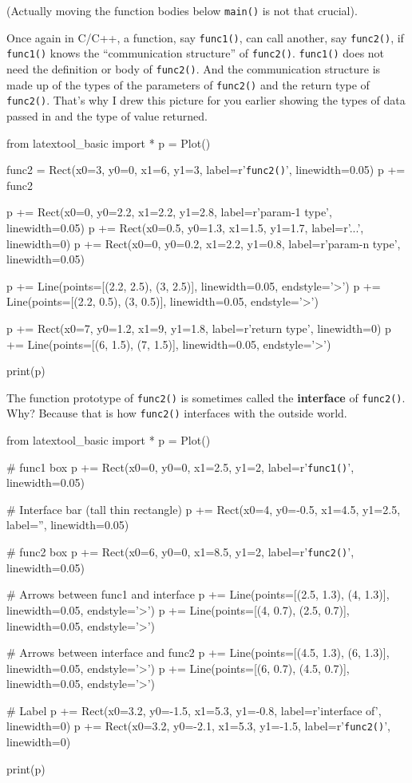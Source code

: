 (Actually moving the function bodies below \texttt{main()} is not that crucial).

Once again in C/C++, a function, say \texttt{func1()}, can call another,
say \texttt{func2()}, if \texttt{func1()} knows the ``communication
structure'' of \texttt{func2()}. \texttt{func1()} does not need the
definition or body of \texttt{func2()}. And the communication structure is
made up of the types of the parameters of \texttt{func2()} and the return
type of \texttt{func2()}. That's why I drew this picture
for you earlier showing the types of data passed in and the type of
value returned.

\begin{python}
from latextool_basic import *
p = Plot()

func2 = Rect(x0=3, y0=0, x1=6, y1=3, label=r'{\tt func2()}', linewidth=0.05)
p += func2

p += Rect(x0=0, y0=2.2, x1=2.2, y1=2.8, label=r'{\small param-1 type}', linewidth=0.05)
p += Rect(x0=0.5, y0=1.3, x1=1.5, y1=1.7, label=r'{\small ...}', linewidth=0)
p += Rect(x0=0, y0=0.2, x1=2.2, y1=0.8, label=r'{\small param-n type}', linewidth=0.05)

p += Line(points=[(2.2, 2.5), (3, 2.5)], linewidth=0.05, endstyle='>')
p += Line(points=[(2.2, 0.5), (3, 0.5)], linewidth=0.05, endstyle='>')

p += Rect(x0=7, y0=1.2, x1=9, y1=1.8, label=r'{\small return type}', linewidth=0)
p += Line(points=[(6, 1.5), (7, 1.5)], linewidth=0.05, endstyle='>')

print(p)
\end{python}

The function prototype of \texttt{func2()} is sometimes called the
\textbf{interface} of \texttt{func2()}. Why? Because that is how
\texttt{func2()} interfaces with the outside world.

\begin{python}
from latextool_basic import *
p = Plot()

# func1 box
p += Rect(x0=0, y0=0, x1=2.5, y1=2, label=r'{\tt func1()}', linewidth=0.05)

# Interface bar (tall thin rectangle)
p += Rect(x0=4, y0=-0.5, x1=4.5, y1=2.5, label='', linewidth=0.05)

# func2 box
p += Rect(x0=6, y0=0, x1=8.5, y1=2, label=r'{\tt func2()}', linewidth=0.05)

# Arrows between func1 and interface
p += Line(points=[(2.5, 1.3), (4, 1.3)], linewidth=0.05, endstyle='>')
p += Line(points=[(4, 0.7), (2.5, 0.7)], linewidth=0.05, endstyle='>')

# Arrows between interface and func2
p += Line(points=[(4.5, 1.3), (6, 1.3)], linewidth=0.05, endstyle='>')
p += Line(points=[(6, 0.7), (4.5, 0.7)], linewidth=0.05, endstyle='>')

# Label
p += Rect(x0=3.2, y0=-1.5, x1=5.3, y1=-0.8, label=r'{\small interface of}', linewidth=0)
p += Rect(x0=3.2, y0=-2.1, x1=5.3, y1=-1.5, label=r'{\small \texttt{func2()}}', linewidth=0)

print(p)
\end{python}

